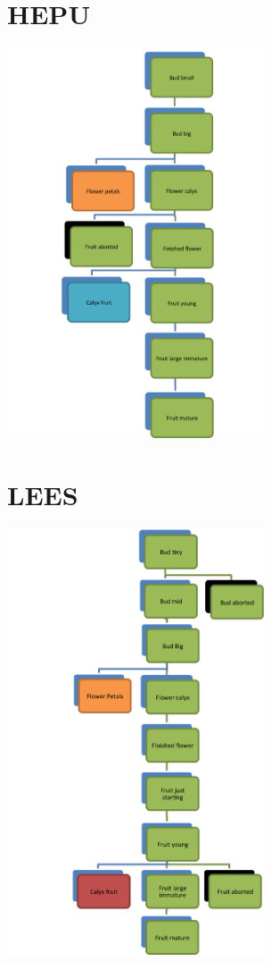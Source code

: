 \documentclass[10pt]{book} %
\begin{document}
\section{HEPU}
\begin{multicols}{2}
\includegraphics[width=3in]{HEPU.png}
\vfill
\columnbreak

\end{multicols}

\clearpage
\newpage

\section{LEES}
\begin{multicols}{2}
\includegraphics[width=3in]{LEES.png}
\vfill
\columnbreak

\\
\end{multicols}
\clearpage
\newpage
\end{document}
